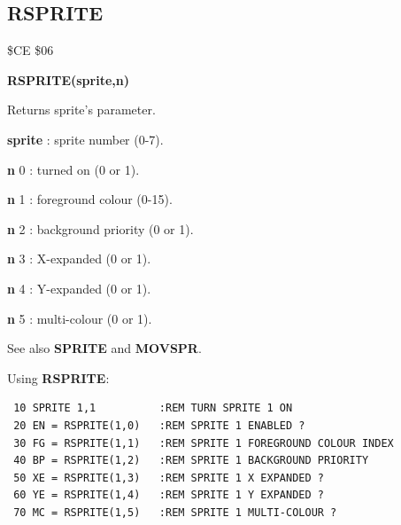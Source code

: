 \subsection{RSPRITE}
\begin{description}[leftmargin=2cm,style=nextline]
\item [Token:] \$CE \$06
\item [Format:] {\bf RSPRITE(sprite,n)}
\item [Usage:]  Returns sprite's parameter.

                {\bf sprite} : sprite number (0-7).

                {\bf n} 0 : turned on (0 or 1).

                {\bf n} 1 : foreground colour (0-15).

                {\bf n} 2 : background priority (0 or 1).

                {\bf n} 3 : X-expanded (0 or 1).

                {\bf n} 4 : Y-expanded (0 or 1).

                {\bf n} 5 : multi-colour (0 or 1).

\item [Remarks:] See also {\bf SPRITE} and {\bf MOVSPR}.

\item [Example:] Using {\bf RSPRITE}:
\begin{tcolorbox}[colback=black,coltext=white]
\verbatimfont{\codefont}
\begin{verbatim}
 10 SPRITE 1,1          :REM TURN SPRITE 1 ON
 20 EN = RSPRITE(1,0)   :REM SPRITE 1 ENABLED ?
 30 FG = RSPRITE(1,1)   :REM SPRITE 1 FOREGROUND COLOUR INDEX
 40 BP = RSPRITE(1,2)   :REM SPRITE 1 BACKGROUND PRIORITY
 50 XE = RSPRITE(1,3)   :REM SPRITE 1 X EXPANDED ?
 60 YE = RSPRITE(1,4)   :REM SPRITE 1 Y EXPANDED ?
 70 MC = RSPRITE(1,5)   :REM SPRITE 1 MULTI-COLOUR ?
\end{verbatim}
\end{tcolorbox}
\end{description}




\newpage
